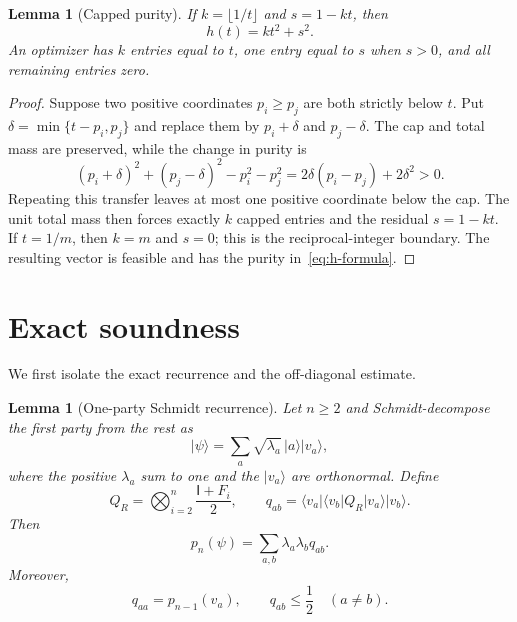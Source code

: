 \documentclass[11pt]{article}
\newtheorem{lemma}[theorem]{Lemma}
\theoremstyle{definition}
\theoremstyle{remark}
\newcommand{\id}{\mathsf{I}}
\newcommand{\ket}[1]{\lvert #1\rangle}
\newcommand{\bra}[1]{\langle #1\rvert}
\begin{document}
\begin{lemma}[Capped purity]\label{lem:capped-purity}
If $k=\lfloor1/t\rfloor$ and $s=1-kt$, then
\begin{equation}\label{eq:h-formula}
  h(t)=kt^2+s^2.
\end{equation}
An optimizer has $k$ entries equal to $t$, one entry equal to $s$ when
$s>0$, and all remaining entries zero.
\end{lemma}

\begin{proof}
Suppose two positive coordinates $p_i\geq p_j$ are both strictly below
$t$.  Put $\delta=\min\{t-p_i,p_j\}$ and replace them by
$p_i+\delta$ and $p_j-\delta$.  The cap and total mass are preserved, while
the change in purity is
\[
  (p_i+\delta)^2+(p_j-\delta)^2-p_i^2-p_j^2
  =2\delta(p_i-p_j)+2\delta^2>0.
\]
Repeating this transfer leaves at most one positive coordinate below the
cap.  The unit total mass then forces exactly $k$ capped entries and the
residual $s=1-kt$.  If $t=1/m$, then $k=m$ and $s=0$; this is the
reciprocal-integer boundary.  The resulting vector is feasible and has the
purity in~\eqref{eq:h-formula}.
\end{proof}

\section{Exact soundness}\label{sec:soundness}

We first isolate the exact recurrence and the off-diagonal estimate.

\begin{lemma}[One-party Schmidt recurrence]\label{lem:recurrence}
Let $n\geq2$ and Schmidt-decompose the first party from the rest as
\begin{equation}\label{eq:schmidt}
  \ket\psi=\sum_a\sqrt{\lambda_a}\,\ket a\ket{v_a},
\end{equation}
where the positive $\lambda_a$ sum to one and the $\ket{v_a}$ are
orthonormal.  Define
\[
  Q_R=\bigotimes_{i=2}^n\frac{\id+F_i}{2},
  \qquad
  q_{ab}=\bra{v_a}\bra{v_b}Q_R\ket{v_a}\ket{v_b}.
\]
Then
\begin{equation}\label{eq:recurrence}
  p_n(\psi)=\sum_{a,b}\lambda_a\lambda_b q_{ab}.
\end{equation}
Moreover,
\begin{equation}\label{eq:q-bounds}
  q_{aa}=p_{n-1}(v_a),
  \qquad
  q_{ab}\leq\frac12\quad(a\neq b).
\end{equation}
\end{lemma}
\end{document}
